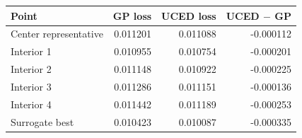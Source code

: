 \begin{tabular}{@{}lrrr@{}}\toprule
Point & GP loss & UCED loss & UCED $-$ GP \\ \midrule
Center representative & 0.011201 & 0.011088 & -0.000112 \\
Interior 1 & 0.010955 & 0.010754 & -0.000201 \\
Interior 2 & 0.011148 & 0.010922 & -0.000225 \\
Interior 3 & 0.011286 & 0.011151 & -0.000136 \\
Interior 4 & 0.011442 & 0.011189 & -0.000253 \\
Surrogate best & 0.010423 & 0.010087 & -0.000335 \\
\bottomrule\end{tabular}
